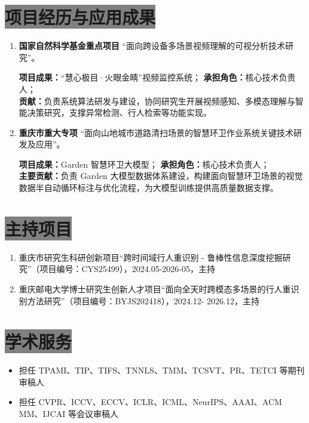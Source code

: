 \documentclass{resume}
\begin{document}
\section{\colorbox{gray}{\color{white}项目经历与应用成果}}

\begin{enumerate}[itemsep=2.5mm]

\item \textbf{国家自然科学基金重点项目}
“面向跨设备多场景视频理解的可视分析技术研究”。


{\small
\textbf{项目成果：}“慧心极目·火眼金睛”视频监控系统；
\hspace{0.3cm} \textbf{承担角色：}核心技术负责人；\\
\textbf{贡献：}负责系统算法研发与建设，协同研究生开展视频感知、多模态理解与智能决策研究，支撑异常检测、行人检索等功能实现。
}


\item \textbf{重庆市重大专项}
“面向山地城市道路清扫场景的智慧环卫作业系统关键技术研发及应用”。

{\small
\textbf{项目成果：}Garden 智慧环卫大模型；
\hspace{2.5cm} \textbf{承担角色：}核心技术负责人；\\
\textbf{主要贡献：}负责 Garden 大模型数据体系建设，构建面向智慧环卫场景的视觉数据半自动循环标注与优化流程，为大模型训练提供高质量数据支撑。
}
\end{enumerate}


\section{\colorbox{gray}{\color{white}主持项目}}
\begin{enumerate}[itemsep=1.8mm]
\item 重庆市研究生科研创新项目“跨时间域行人重识别 - 鲁棒性信息深度挖掘研究”（项目编号：CYS25499），2024.05-2026-05，主持
\item 重庆邮电大学博士研究生创新人才项目“面向全天时跨模态多场景的行人重识别方法研究”（项目编号：BYJS202418），2024.12- 2026.12，主持
\end{enumerate}

\section{\colorbox{gray}{\color{white}学术服务}}
\begin{itemize}[itemsep=1mm]

  \item 担任 TPAMI、TIP、TIFS、TNNLS、TMM、TCSVT、PR、TETCI 等期刊审稿人
  \item 担任 CVPR、ICCV、ECCV、ICLR、ICML、NeurIPS、AAAI、ACM MM、IJCAI 等会议审稿人

\end{itemize}
\end{document}
